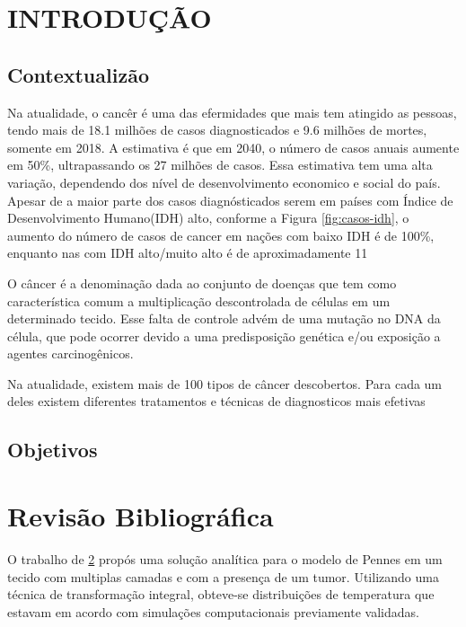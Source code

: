\documentclass[
	12pt,				%
	openright,			%
	oneside,			%
	a4paper,			%
	english,			%
	french,				%
	spanish,			%
	brazil				%
	]{abntex2}
\begin{document}
\chapter{INTRODUÇÃO}
\section{Contextualizão}
 

Na atualidade, o cancêr é uma das efermidades que mais tem atingido as pessoas, tendo  mais de 18.1 milhões de casos diagnosticados e 9.6 milhões de mortes, somente em 2018. A estimativa é que em 2040, o número de casos anuais aumente em 50\%, ultrapassando os 27 milhões de casos. Essa estimativa tem uma alta variação, dependendo dos nível de desenvolvimento economico e social do país. Apesar de a maior parte dos casos diagnósticados serem em países com Índice de Desenvolvimento Humano(IDH) alto, conforme a Figura \ref{fig:casos-idh}, o aumento do número de casos de cancer em nações com baixo IDH é de 100\%, enquanto nas com IDH alto/muito alto é de aproximadamente 11%



O câncer é a denominação dada ao conjunto de doenças que tem como característica comum a multiplicação descontrolada de células em um determinado tecido. Esse falta de controle advém de uma mutação no DNA da célula, que pode ocorrer devido a uma predisposição genética e/ou exposição a agentes carcinogênicos. 

Na atualidade, existem mais de 100 tipos de câncer descobertos. Para cada um deles existem diferentes tratamentos e técnicas de diagnosticos mais efetivas

\section{Objetivos}

\chapter{Revisão Bibliográfica}
O trabalho de \ref{} propós uma solução analítica para o modelo de Pennes em um
tecido com multiplas camadas e com a presença de um tumor. Utilizando uma técnica de
transformação integral, obteve-se distribuições de temperatura que estavam em acordo com
simulações computacionais previamente validadas.
\end{document}
